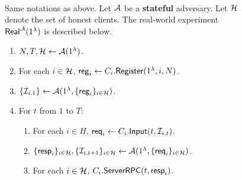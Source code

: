 \begin{figure}[h!]
\begin{framed}
\begin{definition} \hfill\\
\label{defn:real-world}
Same notations as above. Let $\mathcal{A}$ be a \textbf{stateful} adversary. Let $\mathcal{H}$ denote the set of honest clients. The real-world experiment $\mathsf{Real}^{\mathcal{A}}(1^{\lambda})$ is described below.
\begin{enumerate}
\item $N, T, \mathcal{H} \leftarrow \mathcal{A}(1^{\lambda})$.
\item For each $i \in \mathcal{H}$, $\mathsf{reg}_i \leftarrow C_i.\mathsf{Register}(1^{\lambda}, i, N)$. 
\item $\{\mathcal{I}_{i, 1}\} \leftarrow \mathcal{A}(1^{\lambda}, \{\mathsf{reg}_i\}_{i \in \mathcal{H}})$.
\item For $t$ from $1$ to $T$:
    \begin{enumerate}
    \item For each $i \in H$, $\mathsf{req}_i \leftarrow C_i.\mathsf{Input}(t, \mathcal{I}_{i, t})$.
    
    \item $\{\mathsf{resp}_i\}_{i \in \mathcal{H}}, \{\mathcal{I}_{i, t + 1}\}_{i \in \mathcal{H}} \leftarrow \mathcal{A}(1^{\lambda}, \{\mathsf{req}_i\}_{i \in \mathcal{H}})$.
    
    \item For each $i \in \mathcal{H}$, $C_i.\mathsf{ServerRPC}(t, \mathsf{resp}_i)$.
    \end{enumerate}
\end{enumerate}
\end{definition}
\end{framed}
\end{figure}

